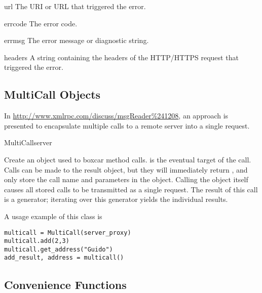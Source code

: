 \begin{memberdesc}{url}
The URI or URL that triggered the error.
\end{memberdesc}

\begin{memberdesc}{errcode}
The error code.
\end{memberdesc}

\begin{memberdesc}{errmsg}
The error message or diagnostic string.
\end{memberdesc}

\begin{memberdesc}{headers}
A string containing the headers of the HTTP/HTTPS request that
triggered the error.
\end{memberdesc}

\subsection{MultiCall Objects}


In \url{http://www.xmlrpc.com/discuss/msgReader\%241208}, an approach
is presented to encapsulate multiple calls to a remote server into a
single request.

\begin{classdesc}{MultiCall}{server}

Create an object used to boxcar method calls.  is the
eventual target of the call. Calls can be made to the result object,
but they will immediately return , and only store the
call name and parameters in the  object. Calling
the object itself causes all stored calls to be transmitted as
a single  request. The result of this call
is a generator; iterating over this generator yields the individual
results.

\end{classdesc}

A usage example of this class is

\begin{verbatim}
multicall = MultiCall(server_proxy)
multicall.add(2,3)
multicall.get_address("Guido")
add_result, address = multicall()
\end{verbatim}

\subsection{Convenience Functions}

